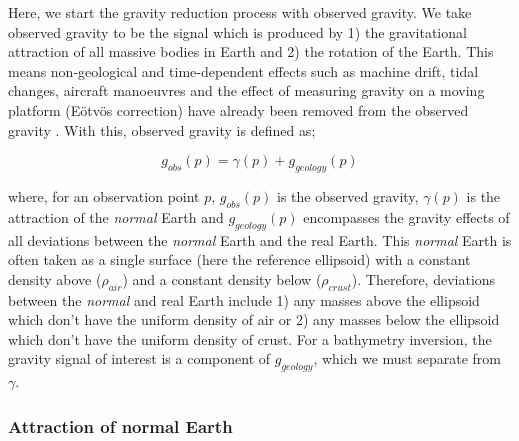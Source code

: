Here, we start the gravity reduction process with observed gravity. We take observed gravity to be the signal which is produced by 1) the gravitational attraction of all massive bodies in Earth and 2) the rotation of the Earth. This means non-geological and time-dependent effects such as machine drift, tidal changes, aircraft manoeuvres and the effect of measuring gravity on a moving platform (E\"{o}tv\"{o}s correction) have already been removed from the observed gravity \citep{hinzenew2005, hinzegravity2013}. With this, observed gravity is defined as;

\begin{equation} \label{chp4:eq:reduction}
    g_{obs}(p) = \gamma(p) + g_{geology}(p)
\end{equation}

\noindent
where, for an observation point $p$, $g_{obs}(p)$ is the observed gravity, $\gamma(p)$ is the attraction of the \textit{normal} Earth and $g_{geology}(p)$ encompasses the gravity effects of all deviations between the \textit{normal} Earth and the real Earth. This \textit{normal} Earth is often taken as a single surface (here the reference ellipsoid) with a constant density above ($\rho_{air}$) and a constant density below ($\rho_{crust}$). Therefore, deviations between the \textit{normal} and real Earth include 1) any masses above the ellipsoid which don't have the uniform density of air or 2) any masses below the ellipsoid which don't have the uniform density of crust. For a bathymetry inversion, the gravity signal of interest is a component of $g_{geology}$, which we must separate from $\gamma$.

\subsubsection{Attraction of normal Earth} \label{ch4 normal gravity}


